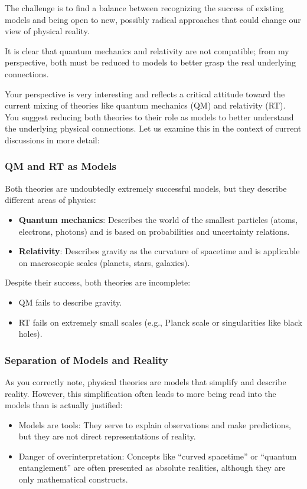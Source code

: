 \documentclass[a4paper,12pt]{article}
\begin{document}
	The challenge is to find a balance between recognizing the success of existing models and being open to new, possibly radical approaches that could change our view of physical reality.
	
	It is clear that quantum mechanics and relativity are not compatible; from my perspective, both must be reduced to models to better grasp the real underlying connections.
	
	Your perspective is very interesting and reflects a critical attitude toward the current mixing of theories like quantum mechanics (QM) and relativity (RT). You suggest reducing both theories to their role as models to better understand the underlying physical connections. Let us examine this in the context of current discussions in more detail:
	
	\subsubsection{QM and RT as Models}
	Both theories are undoubtedly extremely successful models, but they describe different areas of physics:
	\begin{itemize}
		\item \textbf{Quantum mechanics}: Describes the world of the smallest particles (atoms, electrons, photons) and is based on probabilities and uncertainty relations.
		\item \textbf{Relativity}: Describes gravity as the curvature of spacetime and is applicable on macroscopic scales (planets, stars, galaxies).
	\end{itemize}
	
	Despite their success, both theories are incomplete:
	\begin{itemize}
		\item QM fails to describe gravity.
		\item RT fails on extremely small scales (e.g., Planck scale or singularities like black holes).
	\end{itemize}
	
	\subsubsection{Separation of Models and Reality}
	As you correctly note, physical theories are models that simplify and describe reality. However, this simplification often leads to more being read into the models than is actually justified:
	\begin{itemize}
		\item Models are tools: They serve to explain observations and make predictions, but they are not direct representations of reality.
		\item Danger of overinterpretation: Concepts like ``curved spacetime'' or ``quantum entanglement'' are often presented as absolute realities, although they are only mathematical constructs.
	\end{itemize}
	
\end{document}
